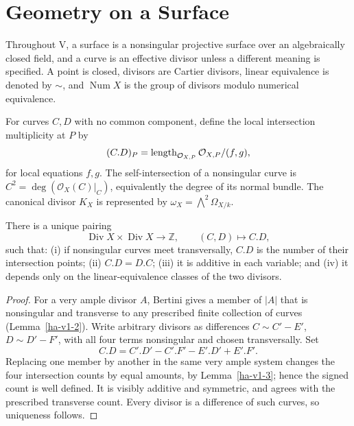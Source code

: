 
\section{Geometry on a Surface}
\label{ha-v1}

\begin{convention}
Throughout V, a surface is a nonsingular projective surface over an algebraically
closed field, and a curve is an effective divisor unless a different meaning is
specified.  A point is closed, divisors are Cartier divisors, linear equivalence
is denoted by \(\sim\), and \(\operatorname{Num}X\) is the group of divisors
modulo numerical equivalence.
\end{convention}

\begin{definition}
For curves $C,D$ with no common component, define the local intersection
multiplicity at $P$ by
\[
(C.D)_P=\operatorname{length}_{\mathcal O_{X,P}}\mathcal O_{X,P}/(f,g),
\]
for local equations $f,g$.  The self-intersection of a nonsingular curve is
$C^2=\deg(\mathcal O_X(C)|_C)$, equivalently the degree of its normal bundle.
The canonical divisor $K_X$ is represented by
$\omega_X=\bigwedge^2\Omega_{X/k}$.
\end{definition}

\begin{theorem}
\label{ha-v1-1}
There is a unique pairing
\[
 \operatorname{Div}X\times\operatorname{Div}X\longrightarrow\mathbb Z,
 \qquad (C,D)\longmapsto C.D,
\]
such that: (i) if nonsingular curves meet transversally, \(C.D\) is the number
of their intersection points; (ii) \(C.D=D.C\); (iii) it is additive in each
variable; and (iv) it depends only on the linear-equivalence classes of the two
divisors.
\end{theorem}
\begin{proof}
For a very ample divisor \(A\), Bertini gives a member of \(|A|\) that is
nonsingular and transverse to any prescribed finite collection of curves
(Lemma~\ref{ha-v1-2}).  Write arbitrary divisors as differences
\(C\sim C'-E'\), \(D\sim D'-F'\), with all four terms nonsingular and chosen
transversally.  Set
\[
 C.D=C'.D'-C'.F'-E'.D'+E'.F'.
\]
Replacing one member by another in the same very ample system changes the four
intersection counts by equal amounts, by Lemma~\ref{ha-v1-3}; hence the signed
count is well defined.  It is visibly additive and symmetric, and agrees with
the prescribed transverse count.  Every divisor is a difference of such curves,
so uniqueness follows.
\end{proof}

